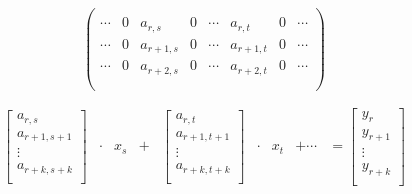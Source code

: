 \documentclass{article}
\begin{document}
      \begin{equation}
        \begin{pmatrix}
          \\
          \cdots & 0 & a_{r,s} &  0 & \cdots & a_{r,t} & 0 & \cdots \\
          \cdots & 0 & a_{r+1,s} & 0 & \cdots & a_{r+1,t} & 0 & \cdots \\
          \cdots & 0 & a_{r+2,s} & 0 & \cdots & a_{r+2,t} & 0 & \cdots \\
          \\
        \end{pmatrix}
      \end{equation}

      \begin{equation}
        \begin{matrix}
          \begin{bmatrix}
            a_{r,s}     \\
            a_{r+1,s+1} \\
               \vdots   \\
            a_{r+k,s+k} \\
          \end{bmatrix} & \cdot & x_s & + & \begin{bmatrix}
                                              a_{r,t}     \\
                                              a_{r+1,t+1} \\
                                                \vdots    \\
                                              a_{r+k,t+k} \\
                                            \end{bmatrix} & \cdot & x_t & + \cdots & = \begin{bmatrix}
                                                                                       y_{r} \\
                                                                                       y_{r+1} \\
                                                                                       \vdots \\
                                                                                       y_{r+k} \\
                                                                                     \end{bmatrix}
        \end{matrix}
      \end{equation}
\end{document}
